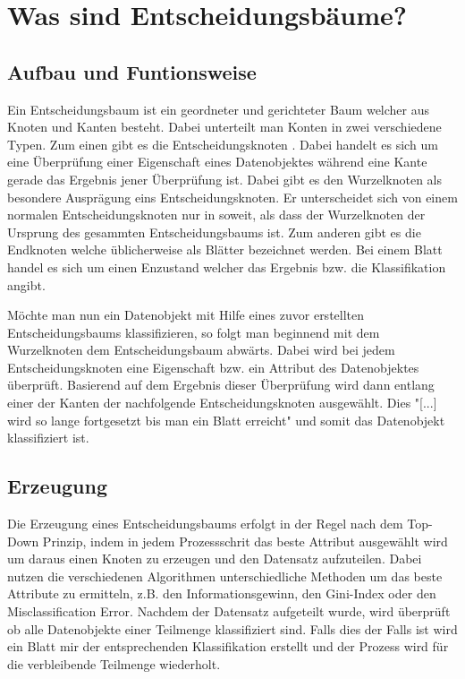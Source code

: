 \chapter{Was sind Entscheidungsbäume?}
\label{eb:was-sind-entscheidungsbaeume}

\section{Aufbau und Funtionsweise}
\label{eb:aufbau}
Ein Entscheidungsbaum ist ein geordneter und gerichteter \autocite{DataMining} Baum welcher aus Knoten und Kanten besteht. Dabei unterteilt man Konten in zwei verschiedene Typen. Zum einen gibt es die Entscheidungsknoten \autocite{FramworkForSensitivity:online}. Dabei handelt es sich um eine Überprüfung einer Eigenschaft eines Datenobjektes \autocite{DataMining} während eine Kante gerade das Ergebnis jener Überprüfung ist. Dabei gibt es den Wurzelknoten als besondere Ausprägung eins Entscheidungsknoten. Er unterscheidet sich von einem normalen Entscheidungsknoten nur in soweit, als dass der Wurzelknoten der Ursprung des gesammten Entscheidungsbaums ist. Zum anderen gibt es die Endknoten \autocite{FramworkForSensitivity:online} welche üblicherweise als Blätter bezeichnet werden. Bei einem Blatt handel es sich um einen Enzustand welcher das Ergebnis bzw. die Klassifikation angibt. \autocite{DataMining}

Möchte man nun ein Datenobjekt mit Hilfe eines zuvor erstellten Entscheidungsbaums klassifizieren, so folgt man beginnend mit dem Wurzelknoten dem Entscheidungsbaum abwärts. Dabei wird bei jedem Entscheidungsknoten eine Eigenschaft bzw. ein Attribut des Datenobjektes überprüft. Basierend auf dem Ergebnis dieser Überprüfung wird dann entlang einer der Kanten der nachfolgende Entscheidungsknoten ausgewählt. \autocite{DataMining} Dies "[...] wird so lange fortgesetzt bis man ein Blatt erreicht" \autocite{Entschei47:online} und somit das Datenobjekt klassifiziert ist.

\section{Erzeugung}
\label{eb:erstellung}
Die Erzeugung eines Entscheidungsbaums erfolgt in der Regel nach dem Top-Down Prinzip, indem in jedem Prozessschrit das beste Attribut ausgewählt wird um daraus einen Knoten zu erzeugen und den Datensatz aufzuteilen. \autocite{TopDownInduction} Dabei nutzen die verschiedenen Algorithmen unterschiedliche Methoden um das beste Attribute zu ermitteln, z.B. den Informationsgewinn, den Gini-Index oder den Misclassification Error. \autocite{DataMining} Nachdem der Datensatz aufgeteilt wurde, wird überprüft ob alle Datenobjekte einer Teilmenge klassifiziert sind. Falls dies der Falls ist wird ein Blatt mir der entsprechenden Klassifikation erstellt und der Prozess wird für die verbleibende Teilmenge wiederholt. \autocite{SebastianManteyPruning:online}

